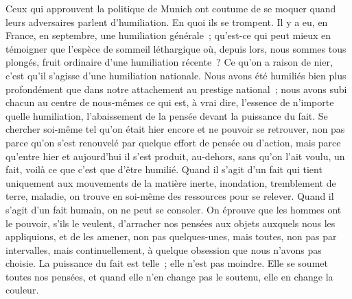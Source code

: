 \documentclass[french,twoside]{book} %
\begin{document}
Ceux qui approuvent la politique de Munich ont coutume de se moquer quand leurs adversaires parlent d'humiliation. En quoi ils se trompent. Il y a eu, en France, en septembre, une humiliation générale ; qu'est-ce qui peut mieux en témoigner que l'espèce de sommeil léthargique où, depuis lors, nous sommes tous plongés, fruit ordinaire d'une humiliation récente ? Ce qu'on a raison de nier, c'est qu'il s'agisse d'une humiliation nationale. Nous avons été humiliés bien plus profondément que dans notre attachement au prestige national ; nous avons subi chacun au centre de nous-mêmes ce qui est, à vrai dire, l'essence de n'importe quelle humiliation, l'abaissement de la pensée devant la puissance du fait. Se chercher soi-même tel qu'on était hier encore et ne pouvoir se retrouver, non pas parce qu'on s'est renouvelé par quelque effort de pensée ou d'action, mais parce qu'entre hier et aujourd'hui il s'est produit, au-dehors, sans qu'on l'ait voulu, un fait, voilà ce que c'est que d'être humilié. Quand il s'agit d'un fait qui tient uniquement aux mouvements de la matière inerte, inondation, tremblement de terre, maladie, on trouve en soi-même des ressources pour se relever. Quand il s'agit d'un fait humain, on ne peut se consoler. On éprouve que les hommes ont le pouvoir, s'ils le veulent, d'arra­cher nos pensées aux objets auxquels nous les appliquions, et de les amener, non pas quelques-unes, mais toutes, non pas par intervalles, mais continuelle­ment, à quelque obsession que nous n'avons pas choisie. La puissance du fait est telle ; elle n'est pas moindre. Elle se soumet toutes nos pensées, et quand elle n'en change pas le soutenu, elle en change la couleur.\par
\end{document}
